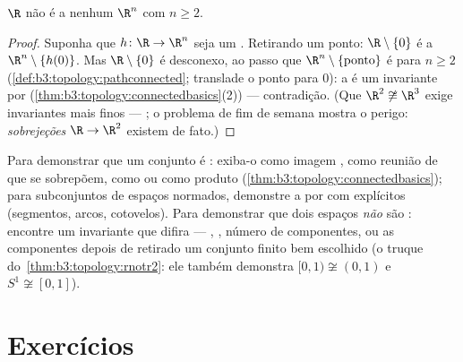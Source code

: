 \begin{theorem}\label{thm:b3:topology:rnotr2}
$\R$ não é  a nenhum $\R^n$ com $n \geq 2$.
\end{theorem}

\begin{proof}
Suponha que $h \colon \R \to \R^n$ seja um . Retirando um ponto: $\R \setminus \{0\}$ é
 a $\R^n \setminus
\{h(0)\}$. Mas $\R\setminus\{0\}$ é desconexo, ao passo que $\R^n\setminus\{\text{ponto}\}$ é  para $n \geq
2$ (\cref{def:b3:topology:pathconnected}; translade o ponto para
$0$): a  é um invariante por 
(\cref{thm:b3:topology:connectedbasics}(2)) --- contradição. (Que $\R^2 \not\cong \R^3$ exige invariantes mais
finos ---  ; o problema de fim de semana mostra o
perigo: \emph{sobrejeções } $\R \to \R^2$ existem de fato.)
\end{proof}

\begin{method}\label{met:b3:topology:connectargument}
Para demonstrar que um conjunto é : exiba-o como imagem ,
como reunião de  que se sobrepõem, como  ou como produto
(\cref{thm:b3:topology:connectedbasics}); para subconjuntos de espaços normados, demonstre a
 por  com  explícitos (segmentos, arcos,
cotovelos). Para demonstrar que dois espaços \emph{não} são
: encontre um invariante  que difira ---
, , número de componentes, ou as componentes
depois de retirado um conjunto finito bem escolhido (o truque
do~\cref{thm:b3:topology:rnotr2}: ele também demonstra $[0,1) \not\cong
(0,1)$ e $S^1 \not\cong [0,1]$).
\end{method}

\section{Exercícios}

